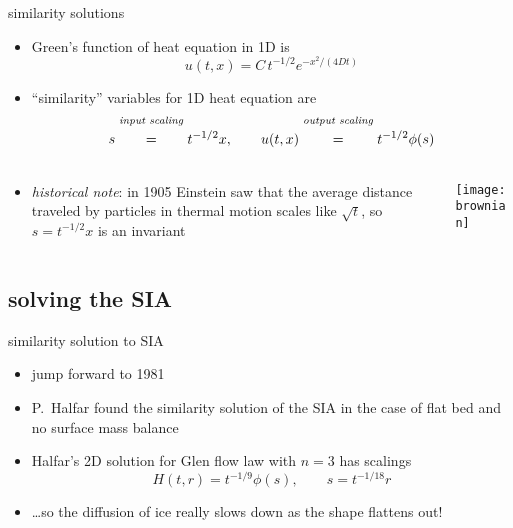 \begin{frame}{similarity solutions}

\begin{itemize}
\item Green's function of heat equation in 1D is
	$$u(t,x) = C\, t^{-1/2} e^{-x^2/(4Dt)}$$
\item ``similarity'' variables for 1D heat equation are
	$$s \stackrel{\text{\emph{input scaling}}}{\phantom{\Big|}=\phantom{\Big|}} t^{-1/2} x, \qquad u(t,x) \stackrel{\text{\emph{output scaling}}}{\phantom{\Big|}=\phantom{\Big|}} t^{-1/2} \phi(s)$$
\end{itemize}
\begin{columns}
\begin{column}{0.6\textwidth}
\begin{itemize}
\item \emph{historical note}:  in 1905 Einstein saw that the average distance traveled by particles in thermal motion scales like $\sqrt{t}$, so $s = t^{-1/2}x$ is an invariant
\end{itemize}
\end{column}
\begin{column}{0.4\textwidth}
\begin{center}
\texttt{[image: brownian]}
\end{center}
\end{column}
\end{columns}

\end{frame}


\subsection{solving the SIA}

\begin{frame}{similarity solution to SIA}

\begin{itemize}
\item jump forward to 1981
\item P.~Halfar found the similarity solution of the SIA in the case of flat bed and no surface mass balance \nocite{Halfar81,Halfar83}
\item Halfar's 2D solution for Glen flow law with $n=3$ has scalings
   $$H(t,r)=t^{-1/9} \phi(s), \qquad s = t^{-1/18} r$$
\item \dots so the diffusion of ice really slows down as the shape flattens out!
\end{itemize}
\end{frame}



